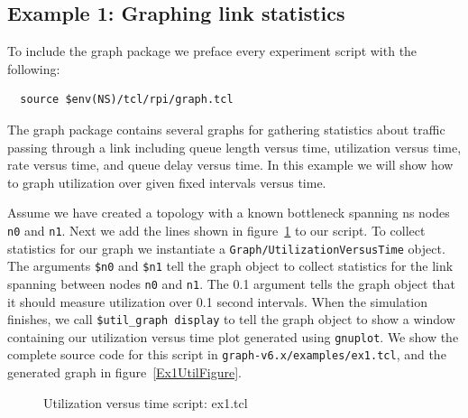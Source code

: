 \documentclass[11pt]{article}
\begin{document}
\subsection{Example 1: Graphing link statistics}

To include the graph package we preface every experiment script with the
following:
  \begin{verbatim}
  source $env(NS)/tcl/rpi/graph.tcl
  \end{verbatim}

The graph package contains several graphs for gathering statistics
about traffic passing through a link including queue length versus time, 
utilization versus time, rate versus time, and queue delay versus time.
In this example we will show how to graph utilization over given
fixed intervals versus time.

Assume we have created a topology with a known bottleneck spanning ns
nodes \verb|n0| and \verb|n1|.  Next we add the lines shown in
figure~\ref{Ex1Figure} to our script.  To collect statistics for our
graph we instantiate a \verb|Graph/UtilizationVersusTime| object.  The
arguments \verb|$n0| and \verb|$n1| tell the graph object to collect
statistics for the link spanning between nodes \verb|n0| and
\verb|n1|.  The 0.1 argument tells the graph object that it should
measure utilization over 0.1 second intervals.  When the simulation
finishes, we call \verb|$util_graph display| to tell the graph object
to show a window containing our utilization versus time plot generated
using \verb|gnuplot|.  We show the complete source code for this script
in \verb|graph-v6.x/examples/ex1.tcl|, and the generated graph in
figure~\ref{Ex1UtilFigure}.

\begin{figure}[!ht]
\begin{center}
\end{center}
\caption{Utilization versus time script: ex1.tcl}\label{Ex1Figure}
\end{figure}
\end{document}
